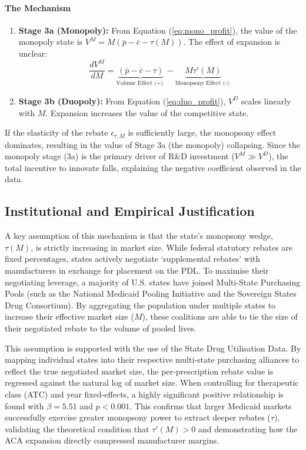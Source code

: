 \documentclass[12pt]{article}
\begin{document}
\paragraph{The Mechanism}
\begin{enumerate}
    \item \textbf{Stage 3a (Monopoly):} From Equation (\ref{eq:mono_profit}), the value of the monopoly state is $V^M = M(\bar{p} - \bar{c} - \tau(M))$. The effect of expansion is unclear:
    \begin{equation}
        \frac{d V^M}{d M} = \underbrace{(\bar{p} - \bar{c} - \tau)}_{\text{Volume Effect (+) }} - \underbrace{M \tau'(M)}_{\text{Monopsony Effect (-) }}
    \end{equation}
    \item \textbf{Stage 3b (Duopoly):} From Equation (\ref{eq:duo_profit}), $V^D$ scales linearly with $M$. Expansion increases the value of the competitive state.
\end{enumerate}

If the elasticity of the rebate $\epsilon_{\tau, M}$ is sufficiently large, the monopsony effect dominates, resulting in the value of Stage 3a (the monopoly) collapsing. Since the monopoly stage (3a) is the primary driver of R\&D investment ($V^M \gg V^D$), the total incentive to innovate falls, explaining the negative coefficient observed in the data.

\subsection{Institutional and Empirical Justification}
A key assumption of this mechanism is that the state's monopsony wedge, $\tau(M)$, is strictly increasing in market size. While federal statutory rebates are fixed percentages, states actively negotiate `supplemental rebates' with manufacturers in exchange for placement on the PDL. To maximise their negotiating leverage, a majority of U.S. states have joined Multi-State Purchasing Pools (such as the National Medicaid Pooling Initiative and the Sovereign States Drug Consortium). By aggregating the population under multiple states to increase their effective market size ($M$), these coalitions are able to tie the size of their negotiated rebate to the volume of pooled lives.

This assumption is supported with the use of the State Drug Utilisation Data. By mapping individual states into their respective multi-state purchasing alliances to reflect the true negotiated market size, the per-prescription rebate value is regressed against the natural log of market size. When controlling for therapeutic class (ATC) and year fixed-effects, a highly significant positive relationship is found with $\beta = 5.51$ and  $p < 0.001$. This confirms that larger Medicaid markets successfully exercise greater monopsony power to extract deeper rebates ($\tau$), validating the theoretical condition that $\tau'(M) > 0$ and demonstrating how the ACA expansion directly compressed manufacturer margins.
\end{document}
